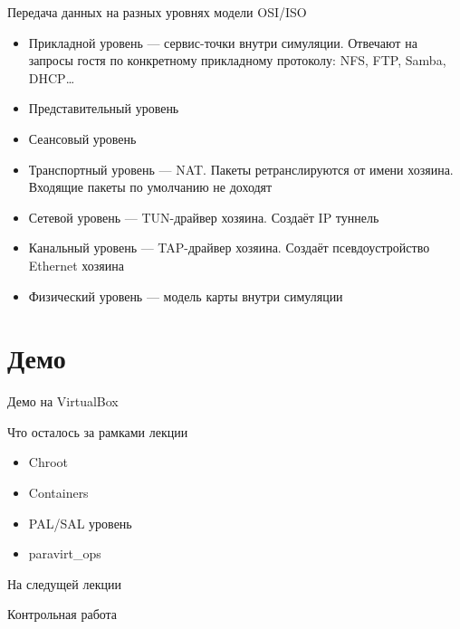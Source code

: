 \begin{frame}{Передача данных на разных уровнях модели OSI/ISO}

{\small
\begin{itemize}
\item Прикладной уровень — сервис-точки внутри симуляции. Отвечают на запросы гостя по конкретному прикладному протоколу: NFS, FTP, Samba, DHCP… 
\item Представительный уровень
\item Сеансовый уровень 
\item Транспортный уровень — NAT. Пакеты ретранслируются от имени хозяина. Входящие пакеты по умолчанию не доходят
\item Сетевой уровень — TUN-драйвер хозяина. Создаёт IP туннель
\item Канальный уровень — TAP-драйвер хозяина. Создаёт псевдоустройство Ethernet хозяина  
\item Физический уровень — модель карты внутри симуляции
\end{itemize}
}

\end{frame}

\section{Демо}

\begin{frame}{Демо на VirtualBox}


\end{frame}

\begin{frame}{Что осталось за рамками лекции}

\begin{itemize}
\item Chroot
\item Containers
\item PAL/SAL уровень
\item paravirt_ops \cite{lwn1, lwn2} 
\end{itemize}

\end{frame}

\begin{frame}{На следущей лекции}

Контрольная работа


\end{frame}


